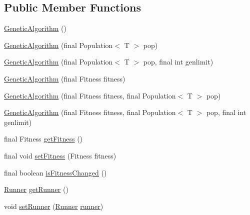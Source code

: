 \subsection*{Public Member Functions}
\begin{DoxyCompactItemize}
\item 
\hyperlink{classjenes_1_1_genetic_algorithm_3_01_t_01extends_01_chromosome_01_4_acfda239e0d2154eb26a7be4f6aa1315d}{Genetic\-Algorithm} ()
\item 
\hyperlink{classjenes_1_1_genetic_algorithm_3_01_t_01extends_01_chromosome_01_4_aede3d2fbd3c3d1cf04a4e419649cae93}{Genetic\-Algorithm} (final Population$<$ T $>$ pop)
\item 
\hyperlink{classjenes_1_1_genetic_algorithm_3_01_t_01extends_01_chromosome_01_4_afe0501230c1645d2a6cdf54af2672639}{Genetic\-Algorithm} (final Population$<$ T $>$ pop, final int genlimit)
\item 
\hyperlink{classjenes_1_1_genetic_algorithm_3_01_t_01extends_01_chromosome_01_4_aefcf45276a730906c98ff8de90b6c48e}{Genetic\-Algorithm} (final Fitness fitness)
\item 
\hyperlink{classjenes_1_1_genetic_algorithm_3_01_t_01extends_01_chromosome_01_4_a08a57814b09412baed3146d2cc6e2174}{Genetic\-Algorithm} (final Fitness fitness, final Population$<$ T $>$ pop)
\item 
\hyperlink{classjenes_1_1_genetic_algorithm_3_01_t_01extends_01_chromosome_01_4_af3997e737162629c161c04a65dd830a0}{Genetic\-Algorithm} (final Fitness fitness, final Population$<$ T $>$ pop, final int genlimit)
\item 
final Fitness \hyperlink{classjenes_1_1_genetic_algorithm_3_01_t_01extends_01_chromosome_01_4_a687996ee45582145be24e2086fc8c210}{get\-Fitness} ()
\item 
final void \hyperlink{classjenes_1_1_genetic_algorithm_3_01_t_01extends_01_chromosome_01_4_aff762153c3f11a2ad83936867ca31617}{set\-Fitness} (Fitness fitness)
\item 
final boolean \hyperlink{classjenes_1_1_genetic_algorithm_3_01_t_01extends_01_chromosome_01_4_a7d5cb4716cbc586aa85774c5dc934d15}{is\-Fitness\-Changed} ()
\item 
\hyperlink{classjenes_1_1utils_1_1multitasking_1_1_runner}{Runner} \hyperlink{classjenes_1_1_genetic_algorithm_3_01_t_01extends_01_chromosome_01_4_a63ea13380fe4a30d1eabd394e44d6e96}{get\-Runner} ()
\item 
void \hyperlink{classjenes_1_1_genetic_algorithm_3_01_t_01extends_01_chromosome_01_4_a6ff8bcd8e9049106c7959637e4e10e70}{set\-Runner} (\hyperlink{classjenes_1_1utils_1_1multitasking_1_1_runner}{Runner} \hyperlink{classjenes_1_1_genetic_algorithm_3_01_t_01extends_01_chromosome_01_4_a9d6056090be623c86c46ad62d37ff164}{runner})

\end{DoxyCompactItemize}

